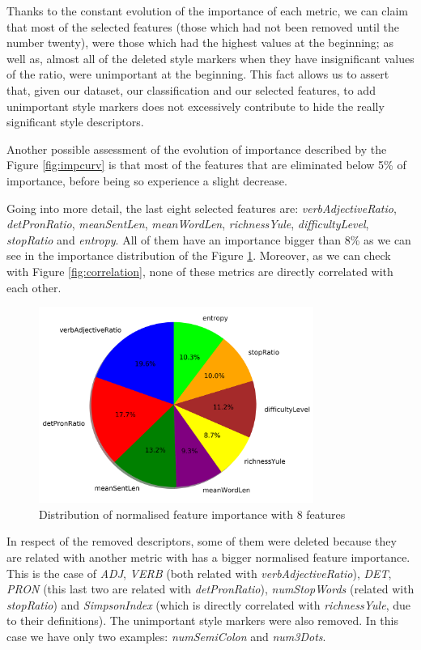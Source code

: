 Thanks to the constant evolution of the importance of each metric, we can claim that most of the selected features (those which had not been removed until the number twenty), were those which had the highest values at the beginning; as well as, almost all of the deleted style markers when they have insignificant values of the ratio, were unimportant at the beginning. This fact allows us to assert that, given our dataset, our classification and our selected features, to add unimportant style markers does not excessively contribute to hide the really significant style descriptors.

Another possible assessment of the evolution of importance described by the Figure \ref{fig:impcurv} is that most of the features that are eliminated below 5\% of importance, before being so experience a slight decrease.

Going into more detail, the last eight selected features are: \textit{verbAdjectiveRatio}, \textit{detPronRatio}, \textit{meanSentLen}, \textit{meanWordLen}, \textit{richnessYule}, \textit{difficultyLevel}, \textit{stopRatio} and \textit{entropy}. All of them have an importance bigger than 8\% as we can see in the importance distribution of the Figure \ref{fig:nfi8}. Moreover, as we can check with Figure \ref{fig:correlation}, none of these metrics are directly correlated with each other.

\begin{figure}
	\centering%
	\centerline{\includegraphics[width=0.8\textwidth]{Imagenes/Bitmap/DecisionTrees/pie8.png}}%
	\caption{Distribution of normalised feature importance with 8 features}%
	\label{fig:nfi8}
\end{figure}

In respect of the removed descriptors, some of them were deleted because they are related with another metric with has a bigger normalised feature importance. This is the case of \textit{ADJ}, \textit{VERB} (both related with \textit{verbAdjectiveRatio}), \textit{DET}, \textit{PRON} (this last two are related with \textit{detPronRatio}), \textit{numStopWords} (related with \textit{stopRatio}) and \textit{SimpsonIndex} (which is directly correlated with \textit{richnessYule}, due to their definitions). The unimportant style markers were also removed. In this case we have only two examples: \textit{numSemiColon} and \textit{num3Dots}.

